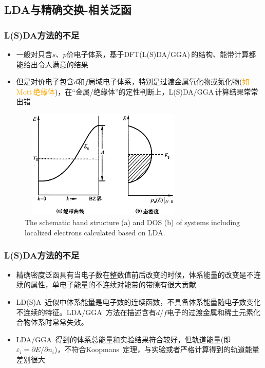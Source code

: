 \documentclass[cjk,slidestop,compress,mathserif,blue]{beamer}
\newcommand{\upcite}[1]{\hspace{0ex}\textsuperscript{\cite{#1}}} %
\begin{document}
\subsection{\rm{LDA}与精确交换-相关泛函}
\frame
{
	\frametitle{\textrm{L(S)DA}方法的不足}
	\begin{itemize}
		\item 一般对只含$s$、$p$价电子体系，基于\textrm{DFT(L(S)DA/GGA)\,}的结构、能带计算都能给出令人满意的结果
		\item 但是对价电子包含$d$和$f$局域电子体系，特别是过渡金属氧化物或氮化物(\textcolor{orange}{如\textrm{Mott}\,绝缘体})，在“金属/绝缘体”的定性判断上，\textrm{L(S)DA/GGA}\,计算结果常常出错
	\end{itemize}
\begin{figure}[h!]
\centering
\vspace*{-0.35in}
\includegraphics[height=2.05in,width=3.2in,viewport=0 0 1200 880,clip]{Figures/LDA_U-3.png}
\caption{\tiny \textrm{The schematic band structure (a) and DOS (b) of systems including localized electrons calculated based on LDA.}}%
\label{LDA_U-3}
\end{figure}
}

\frame
{
	\frametitle{\textrm{L(S)DA}方法的不足}
\begin{itemize}
\setlength{\itemsep}{12pt}
	\item 精确密度泛函具有当电子数在整数值前后改变的时候，体系能量的改变是不连续的属性，单电子能量的不连续对能带的带隙有很大贡献
	 \item\textrm{LD(S)A~}近似中体系能量是电子数的连续函数，不具备体系能量随电子数变化不连续的特征。\textrm{LDA/GGA~}方法在描述含有$d$/$f$电子的过渡金属和稀土元素化合物体系时常常失效。
	\item \textrm{LDA}/\textrm{GGA~}得到的体系总能量和实验结果符合较好，但轨道能量(即$\varepsilon_i=\partial E/\partial n_i$)，不符合\textrm{Koopmans~}定理，与实验或者严格计算得到的轨道能量差别很大%
\end{itemize}
}
\end{document}
